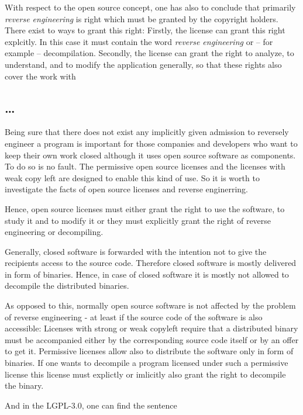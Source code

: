 With respect to the open source concept, one has also to conclude that primarily
\emph{reverse engineering} is right which must be granted by the copyright
holders. There exist to ways to grant this right: Firstly, the license can grant
this right explcitly. In this case it must contain the word \emph{reverse
engineering} or -- for example -- decompilation. Secondly, the license can grant
the right to analyze, to understand, and to modify the application generally, so
that these rights also cover the work with

\subsection{\ldots}

Being sure that there does not exist any implicitly given admission to reversely
engineer a program is important for those companies and developers who want to
keep their own work closed although it uses open source software as components.
To do so is no fault. The permissive open source licenses and the licenses with
weak copy left are designed to enable this kind of use. So it is worth to
investigate the facts of open source licenses and reverse enginerring.



Hence, open source licenses must either grant the right to use the software, to
study it and to modify it or they must explicitly grant the right of reverse
engineering or decompiling.

Generally, closed software is forwarded with the intention not to give the
recipients access to the source code. Therefore closed software is mostly
delivered in form of binaries. Hence, in case of closed software it is mostly
not allowed to decompile the distributed binaries.

As opposed to this, normally open source software is not affected by the problem
of reverse engineering - at least if the source code of the software is also
accessible: Licenses with strong or weak copyleft require that a distributed
binary must be accompanied either by the corresponding source code itself or by
an offer to get it. Permissive licenses allow also to distribute the software
only in form of binaries. If one wants to decompile a program licensed under
such a permissive license this license must explictly or imlicitly also grant
the right to decompile the binary.




And in the LGPL-3.0, one can find the sentence


